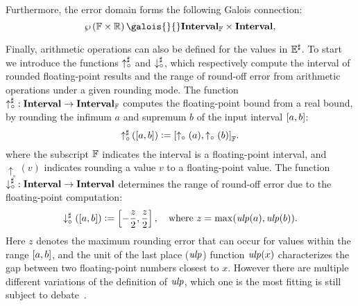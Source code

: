 Furthermore, the error domain forms the following Galois connection:
\begin{equation}
    \powersetof{\floatset\times\realset}
    \galois{}{}
    \floatintervalset\times\intervalset,
\end{equation}

Finally, arithmetic operations can also be defined for the values in
$\mathbb{E}^\sharp$.  To start we introduce the functions $\operatorname{\uparrow^\sharp_\circ}$ and
$\operatorname{\downarrow^\sharp_\circ}$, which respectively compute the interval of rounded
floating-point results and the range of round-off error from arithmetic
operations under a given rounding mode.  The function $\operatorname{\uparrow^\sharp_\circ}: \mathbf{Interval}
\to \mathbf{Interval}_\mathbb{F}$ computes the floating-point bound from a real
bound, by rounding the infimum $a$ and supremum $b$ of the input interval
$\left[{a}, {b}\right]$:
\begin{equation}
    \operatorname{\uparrow^\sharp_\circ}\left(\left[a, b\right]\right)
    \vcentcolon= {\left[
        \uparrow_\circ{\left(a\right)},
        \uparrow_\circ{\left(b\right)}
    \right]}_\mathbb{F}.
\end{equation}
where the subscript $\mathbb{F}$ indicates the interval is a floating-point
interval, and $\uparrow_\circ{\left(v\right)}$ indicates rounding a value
$v$ to a floating-point value.  The function $\operatorname{\downarrow^\sharp_\circ}: \mathbf{Interval} \to
\mathbf{Interval}$ determines the range of round-off error due to the floating-point
computation:
\begin{equation}
    \downarrow^\sharp_\circ(\left[{a}, {b}\right]) \vcentcolon=
        \left[ -\frac{z}{2}, \frac{z}{2}\right], \quad \text{where~}
        z = \max(\operatorname{\mathit{ulp}}(a), \operatorname{\mathit{ulp}}(b)).
\end{equation}
Here $z$ denotes the maximum rounding error that can occur for values
within the range $\left[{a}, {b}\right]$, and the unit of the last place ($\operatorname{\mathit{ulp}}$)
function $\operatorname{\mathit{ulp}}(x)$ characterizes the gap between two floating-point numbers
closest to $x$.  However there are multiple different variations of the
definition of $\operatorname{\mathit{ulp}}$, which one is the most fitting is still subject to
debate~\cite{muller}.

